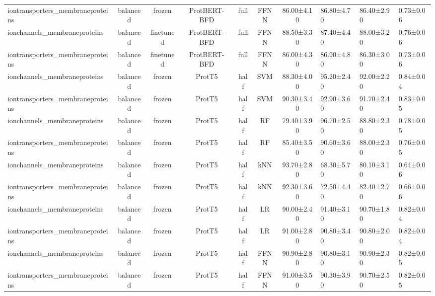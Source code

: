 \begin{tabular}{lcccccc}
iontransporters\_membraneproteins &   balanced &         frozen & ProtBERT-BFD &      full &       FFNN &  86.00±4.10 &  86.80±4.70 &  86.40±2.90 & 0.73±0.06 \\
    ionchannels\_membraneproteins &   balanced &      finetuned & ProtBERT-BFD &      full &       FFNN &  88.50±3.30 &  87.40±4.40 &  88.00±3.20 & 0.76±0.06 \\
iontransporters\_membraneproteins &   balanced &      finetuned & ProtBERT-BFD &      full &       FFNN &  86.00±4.30 &  86.90±4.80 &  86.30±3.00 & 0.73±0.06 \\
    ionchannels\_membraneproteins &   balanced &         frozen &       ProtT5 &      half &        SVM &  88.30±4.00 &  95.20±2.40 &  92.00±2.20 & 0.84±0.04 \\
iontransporters\_membraneproteins &   balanced &         frozen &       ProtT5 &      half &        SVM &  90.30±3.40 &  92.90±3.60 &  91.70±2.40 & 0.83±0.05 \\
    ionchannels\_membraneproteins &   balanced &         frozen &       ProtT5 &      half &         RF &  79.40±3.90 &  96.70±2.50 &  88.80±2.30 & 0.78±0.05 \\
iontransporters\_membraneproteins &   balanced &         frozen &       ProtT5 &      half &         RF &  85.40±3.50 &  90.60±3.60 &  88.00±2.30 & 0.76±0.05 \\
    ionchannels\_membraneproteins &   balanced &         frozen &       ProtT5 &      half &        kNN &  93.70±2.80 &  68.30±5.70 &  80.10±3.10 & 0.64±0.06 \\
iontransporters\_membraneproteins &   balanced &         frozen &       ProtT5 &      half &        kNN &  92.30±3.60 &  72.50±4.40 &  82.40±2.70 & 0.66±0.06 \\
    ionchannels\_membraneproteins &   balanced &         frozen &       ProtT5 &      half &         LR &  90.00±2.40 &  91.40±3.10 &  90.70±1.80 & 0.82±0.04 \\
iontransporters\_membraneproteins &   balanced &         frozen &       ProtT5 &      half &         LR &  91.00±2.80 &  90.80±3.40 &  90.80±2.00 & 0.82±0.04 \\
    ionchannels\_membraneproteins &   balanced &         frozen &       ProtT5 &      half &       FFNN &  90.90±2.80 &  90.80±3.10 &  90.90±2.30 & 0.82±0.05 \\
iontransporters\_membraneproteins &   balanced &         frozen &       ProtT5 &      half &       FFNN &  91.00±3.50 &  90.30±3.90 &  90.70±2.50 & 0.82±0.05 \\

\end{tabular}
